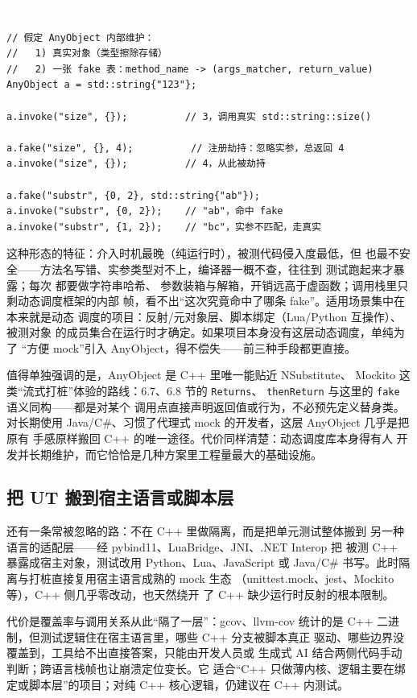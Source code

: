 \documentclass[12pt,a4paper,fontset=fandol]{ctexbook}
\newcommand{\cpplabel}{%
  \begin{tcolorbox}[enhanced,colback=cppheadbg,colframe=cppheadbg,
    arc=1mm,boxrule=0mm,left=6pt,right=6pt,top=2pt,bottom=2pt,
    halign=left,oversize]
    \textcolor{white}{\small\bfseries C++}
  \end{tcolorbox}\vspace{-4pt}}
\begin{document}
\cpplabel
\begin{lstlisting}
// 假定 AnyObject 内部维护：
//   1) 真实对象（类型擦除存储）
//   2) 一张 fake 表：method_name -> (args_matcher, return_value)
AnyObject a = std::string{"123"};

a.invoke("size", {});          // 3，调用真实 std::string::size()

a.fake("size", {}, 4);          // 注册劫持：忽略实参，总返回 4
a.invoke("size", {});          // 4，从此被劫持

a.fake("substr", {0, 2}, std::string{"ab"});
a.invoke("substr", {0, 2});    // "ab"，命中 fake
a.invoke("substr", {1, 2});    // "bc"，实参不匹配，走真实
\end{lstlisting}

这种形态的特征：介入时机最晚（纯运行时），被测代码侵入度最低，但
也最不安全——方法名写错、实参类型对不上，编译器一概不查，往往到
测试跑起来才暴露；每次  都要做字符串哈希、
参数装箱与解箱，开销远高于虚函数；调用栈里只剩动态调度框架的内部
帧，看不出“这次究竟命中了哪条 fake”。适用场景集中在本来就是动态
调度的项目：反射/元对象层、脚本绑定（Lua/Python 互操作）、被测对象
的成员集合在运行时才确定。如果项目本身没有这层动态调度，单纯为了
“方便 mock”引入 AnyObject，得不偿失——前三种手段都更直接。

值得单独强调的是，AnyObject 是 C++ 里唯一能贴近 NSubstitute、
Mockito 这类“流式打桩”体验的路线：6.7、6.8 节的 \texttt{Returns}、
\texttt{thenReturn} 与这里的 \texttt{fake} 语义同构——都是对某个
调用点直接声明返回值或行为，不必预先定义替身类。对长期使用
Java/C\#、习惯了代理式 mock 的开发者，这层 AnyObject 几乎是把原有
手感原样搬回 C++ 的唯一途径。代价同样清楚：动态调度库本身得有人
开发并长期维护，而它恰恰是几种方案里工程量最大的基础设施。

\subsection{把 UT 搬到宿主语言或脚本层}

还有一条常被忽略的路：不在 C++ 里做隔离，而是把单元测试整体搬到
另一种语言的适配层——经 pybind11、LuaBridge、JNI、.NET Interop 把
被测 C++ 暴露成宿主对象，测试改用 Python、Lua、JavaScript 或
Java/C\# 书写。此时隔离与打桩直接复用宿主语言成熟的 mock 生态
（unittest.mock、jest、Mockito 等），C++ 侧几乎零改动，也天然绕开
了 C++ 缺少运行时反射的根本限制。

代价是覆盖率与调用关系从此“隔了一层”：gcov、llvm-cov 统计的是
C++ 二进制，但测试逻辑住在宿主语言里，哪些 C++ 分支被脚本真正
驱动、哪些边界没覆盖到，工具给不出直接答案，只能由开发人员或
生成式 AI 结合两侧代码手动判断；跨语言栈帧也让崩溃定位变长。它
适合“C++ 只做薄内核、逻辑主要在绑定或脚本层”的项目；对纯 C++
核心逻辑，仍建议在 C++ 内测试。
\end{document}
